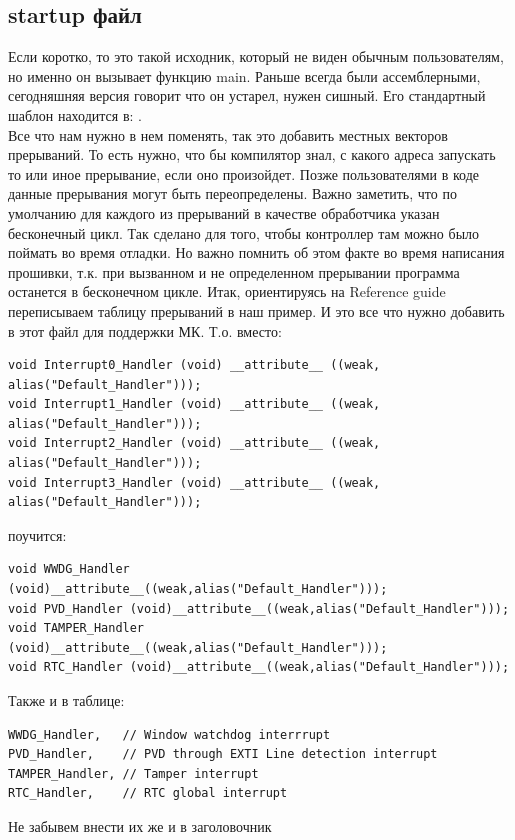 \documentclass[12pt,a4paper]{article}
\begin{document}
\subsection{startup файл}\label{1999}
    Если коротко, то это такой исходник, который не виден обычным пользователям,
    но именно он вызывает функцию main. Раньше всегда были ассемблерными,
    сегодняшняя версия говорит что он устарел, нужен сишный. Его стандартный
    шаблон находится в:
    .\\
    Все что нам нужно в нем поменять, так это добавить местных векторов
    прерываний. То есть нужно, что бы компилятор знал, с какого адреса запускать
    то или иное прерывание, если оно произойдет. Позже пользователями в коде
    данные прерывания могут быть переопределены. Важно заметить, что по
    умолчанию для каждого из прерываний в качестве обработчика указан
    бесконечный цикл. Так сделано для того, чтобы контроллер там можно было
    поймать во время отладки. Но важно помнить об этом факте во время
    написания прошивки, т.к. при вызванном и не определенном прерывании
    программа останется в бесконечном цикле. Итак, ориентируясь на Reference
    guide переписываем таблицу прерываний в наш пример. И это все что нужно
    добавить в этот файл для поддержки МК. Т.о. вместо:
\begin{lstlisting}
void Interrupt0_Handler (void) __attribute__ ((weak, alias("Default_Handler")));
void Interrupt1_Handler (void) __attribute__ ((weak, alias("Default_Handler")));
void Interrupt2_Handler (void) __attribute__ ((weak, alias("Default_Handler")));
void Interrupt3_Handler (void) __attribute__ ((weak, alias("Default_Handler")));
\end{lstlisting}
    поучится:
\begin{lstlisting}
void WWDG_Handler (void)__attribute__((weak,alias("Default_Handler")));
void PVD_Handler (void)__attribute__((weak,alias("Default_Handler")));
void TAMPER_Handler (void)__attribute__((weak,alias("Default_Handler")));
void RTC_Handler (void)__attribute__((weak,alias("Default_Handler")));
\end{lstlisting}
    Также и в таблице:
\begin{lstlisting}
WWDG_Handler,   // Window watchdog interrrupt
PVD_Handler,    // PVD through EXTI Line detection interrupt
TAMPER_Handler, // Tamper interrupt
RTC_Handler,    // RTC global interrupt
\end{lstlisting}
    Не забывем внести их же и в заголовочник\\
\end{document}
